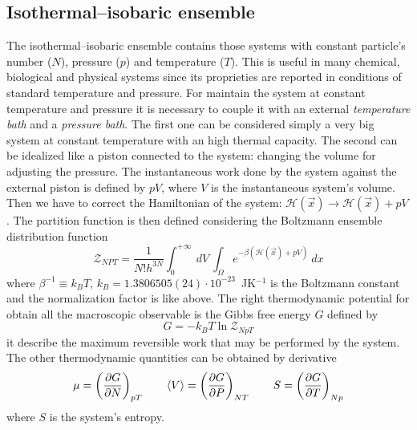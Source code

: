 \subsection{Isothermal--isobaric ensemble}
The isothermal--isobaric ensemble contains those systems with constant particle's number ($N$), pressure ($p$) and temperature ($T$). This is useful in many chemical, biological and physical systems since its proprieties are reported in conditions of standard temperature and pressure. For maintain the system at constant temperature and pressure it is necessary to couple it with an external \textit{temperature bath} and a \textit{pressure bath}. The first one can be considered simply a very big system at constant temperature with an high thermal capacity. The second can be idealized like a piston connected to the system: changing the volume for adjusting the pressure. The instantaneous work done by the system against the external piston is defined by $pV$, where $V$ is the instantaneous system's volume. Then we have to correct the Hamiltonian of the system: $\mathcal{H}(\vec x) \rightarrow \mathcal{H}(\vec x) + pV$. The partition function is then defined considering the Boltzmann ensemble distribution function
\begin{equation}
	\mathcal{Z}_{NPT} = \frac{1}{N!h^{3N}}\int_0^{+\infty}\ dV \ \int_\Omega e^{-\beta(\mathcal{H}(\vec x) + pV)}\ dx
\end{equation}
where $\beta^{-1} \equiv k_B T$, $k_B = 1.3806505(24) \cdot 10^{-23}$~JK$^{-1}$ is the Boltzmann constant and the normalization factor is like above. The right thermodynamic potential for obtain all the macroscopic observable is the Gibbs free energy $G$ defined by
\begin{equation}
	G = -k_B T\ln \mathcal{Z}_{NpT}
\end{equation}
it describe the maximum reversible work that may be performed by the system. The other thermodynamic quantities can be obtained by derivative
\begin{equation}
	\mu = \left ( \frac{\partial G}{\partial N}\right )_{pT} \qquad \langle V \rangle = \left ( \frac{\partial G}{\partial P}\right )_{NT} \qquad S = \left ( \frac{\partial G}{\partial T}\right )_{Np}
\end{equation}
where $S$ is the system's entropy.


